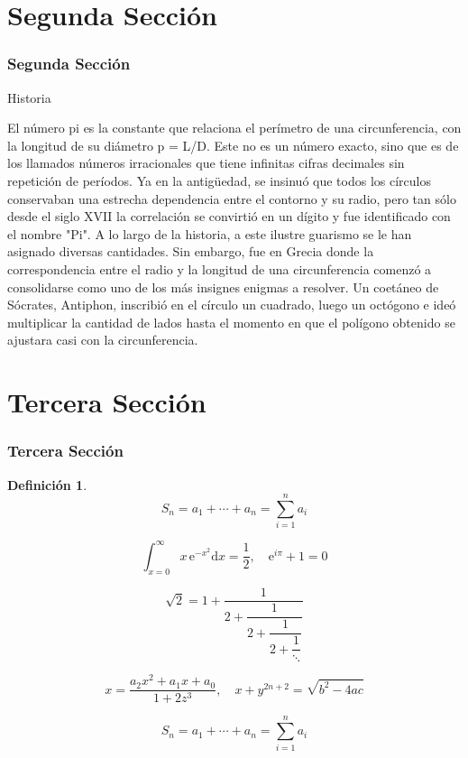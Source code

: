\documentclass{beamer}
\newtheorem{definicion}{Definición}
\begin{document}
\section{Segunda Sección}

\begin{frame}

\frametitle{Segunda Sección}

\begin{block}{Historia}
 
El número pi es la constante que relaciona el perímetro de una circunferencia,
con la longitud de su diámetro p = L/D. Este no es un número exacto, sino que es de los llamados números irracionales 
que tiene infinitas cifras decimales sin repetición de períodos. Ya en la antigüedad, se insinuó que todos los círculos 
conservaban una estrecha dependencia entre el contorno y su radio, pero tan sólo desde el siglo XVII la correlación se 
convirtió en un dígito y fue identificado con el nombre "Pi". A lo largo de la historia, a este ilustre guarismo se le han asignado diversas cantidades.
Sin embargo, fue en Grecia donde la correspondencia entre el radio y la longitud de una circunferencia comenzó a consolidarse 
como uno de los más insignes enigmas a resolver. Un coetáneo de Sócrates, Antiphon, inscribió en el círculo un cuadrado, 
luego un octógono e ideó multiplicar la cantidad de lados hasta el momento en que el polígono obtenido se ajustara casi con
la circunferencia.

\end{block}

\end{frame}



\section{Tercera Sección}


\begin{frame}

\frametitle{Tercera Sección}

\begin{definicion}
\[ S_n=a_1+\cdots + a_n = \sum_{i=1}^n a_i \]

\[\int_{x=0}^{\infty} x\,\text{e}^{-x^2}\text{d}x=\frac{1}{2},\quad\text{e}^{i\pi}+1=0\]

\[ \sqrt 2 = 1+\dfrac{1}{2+\dfrac{1}{2+\dfrac{1}{2+\dfrac{1}{\ddots}}}} \]

\[x=\frac{a_2 x^2 + a_1 x + a_0}{1+2z^3}, \quad x+y^{2n+2}=\sqrt{b^2-4ac}\]

\[ S_n=a_1+\cdots + a_n = \sum_{i=1}^n a_i \]

\end{definicion}

\end{frame}
\end{document}
